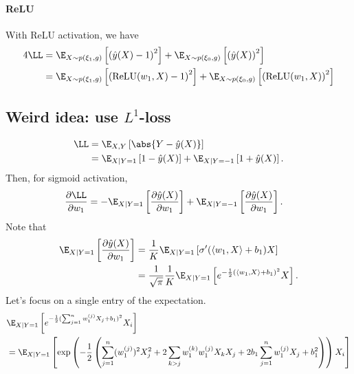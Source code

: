 \documentclass{article}
\begin{document}
\paragraph*{ReLU}
With ReLU activation, we have
\begin{align}
  4 \LL
  &= \E_{X \sim p(\xi_1, g)} \left[ \left( \hat{y}(X) - 1 \right)^2 \right] + \E_{X \sim p(\xi_0, g)} \left[ \left( \hat{y}(X) \right)^2 \right] \\
  &= \E_{X \sim p(\xi_1, g)} \left[ \left( \text{ReLU}( w_1, X ) - 1 \right)^2 \right] + \E_{X \sim p(\xi_0, g)} \left[ \left( \text{ReLU}( w_1, X ) \right)^2 \right]
\end{align}


\newpage
\subsection*{Weird idea: use $L^1$-loss}
\begin{align}
  \LL 
  &= \E_{X,Y} \left[ \abs{ Y - \hat{y}(X) } \right] \\
  &= \E_{X \mid Y=1} \left[ 1 - \hat{y}(X) \right] + \E_{X \mid Y=-1} \left[ 1 + \hat{y}(X) \right].
\end{align}
Then, for sigmoid activation,
\begin{align}
  \frac{\partial \LL}{\partial w_1} 
  &= -\E_{X \mid Y=1} \left[ \frac{\partial \hat{y}(X)}{\partial w_1} \right] + \E_{X \mid Y=-1} \left[ \frac{\partial \hat{y}(X)}{\partial w_1} \right].
\end{align}
Note that
\begin{align}
  \E_{X \mid Y=1} \left[ \frac{\partial \hat{y}(X)}{\partial w_1} \right]
  &= \frac{1}{K} \E_{X \mid Y=1} \left[ \sigma'( \langle w_1, X \rangle + b_1 ) X \right] \\
  &= \frac{1}{\sqrt{\pi}} \frac{1}{K} \E_{X \mid Y=1} \left[ e^{-\frac{1}{2}( \langle w_1, X \rangle + b_1)^2 } X \right].
\end{align}
Let's focus on a single entry of the expectation.
\begin{align}
  &\E_{X \mid Y=1} \left[ e^{-\frac{1}{2}( \sum_{j=1}^{n} w_1^{(j)} X_j + b_1)^2 } X_i \right] \\
  &= \E_{X \mid Y=1} \left[ \exp \left( -\frac{1}{2} \left( \sum_{j=1}^{n} (w_1^{(j)})^2 X_j^2 + 2 \sum_{k>j} w_1^{(k)} w_1^{(j)} X_k X_j + 2 b_1 \sum_{j=1}^{n} w_1^{(j)} X_j + b_1^2 \right) \right) X_i \right]
\end{align}
\end{document}
